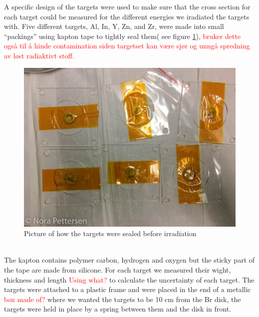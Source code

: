 \documentclass[twoside,english]{uiofysmaster/uiofysmaster}
\begin{document}
A specific design of the targets were used to make sure that the cross section for each target could be measured for the different energies we iradiated the targets with. Five different targets, Al, In, Y, Zn, and Zr, were made into small “packings” using kapton tape to tightly seal them( see figure \ref{fig:target_design}), \textcolor{red}{ bruker dette også til å hinde contamination siden targetset kan være sjør og unngå spredning av løst radiaktivt stoff. }
\begin{figure} [h!]
   \centering
   \includegraphics[scale=.2]{packs-1.JPG}
   \caption{Picture of how the targets were sealed before irradiation}
   \label{fig:target_design}
\end{figure}
\\
\noindent
The kapton contains polymer carbon, hydrogen and oxygen but the sticky part of the tape are made from silicone. For each target we measured their wight, thickness and length \textcolor{red}{Using what?} to calculate the uncertainty of each target. The targets were attached to a plastic frame and were placed in the end of a metallic \textcolor{red}{box made of?} where we wanted the targets to be 10 cm from the Br disk, the targets were held in place by a spring between them and the disk in front. 
\end{document}

